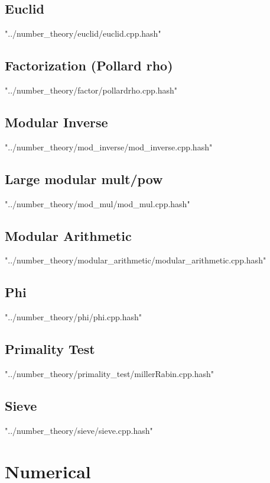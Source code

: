 \documentclass [a4paper,5pt,oneside, landscape]{article}
\begin{document}
\begin{multicols}{3}
\subsection{ Euclid}
 {"../number_theory/euclid/euclid.cpp.hash"}


\subsection{ Factorization (Pollard rho)}
 {"../number_theory/factor/pollardrho.cpp.hash"}


\subsection{ Modular Inverse}
 {"../number_theory/mod_inverse/mod_inverse.cpp.hash"}


\subsection{ Large modular mult/pow}
 {"../number_theory/mod_mul/mod_mul.cpp.hash"}


\subsection{ Modular Arithmetic}
 {"../number_theory/modular_arithmetic/modular_arithmetic.cpp.hash"}


\subsection{ Phi}
 {"../number_theory/phi/phi.cpp.hash"}


\subsection{ Primality Test}
 {"../number_theory/primality_test/millerRabin.cpp.hash"}


\subsection{ Sieve}
 {"../number_theory/sieve/sieve.cpp.hash"}



\section{Numerical}

\end{multicols}
\end{document}
